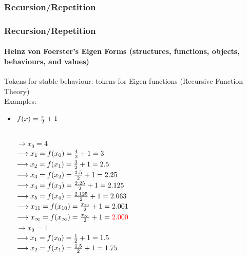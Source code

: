 \documentclass[
	11pt,
	aspectratio=169,
]{beamer}
\begin{document}
            \subsubsection{Recursion/Repetition}
                \begin{frame}
                    \frametitle{Recursion/Repetition}
                    \framesubtitle{Heinz von Foerster's Eigen Forms (structures, functions, objects, behaviours, and values)}
                    Tokens for stable behaviour: tokens for Eigen functions (Recursive Function Theory)\\
                    Examples:
                    \begin{itemize}
                        \item<1-> $f(x)= {{x}\over{2}} +1$\\
                            \fontsize{8}{9.2}\selectfont
                            \begin{columns}
                                    $\longrightarrow x_0=4$\\
                                    $\longrightarrow x_1=f(x_0) = {{4}\over{2}} + 1 = 3$ \\
                                    $\longrightarrow x_2=f(x_1) = {{3}\over{2}} + 1 = 2.5$ \\
                                    $\longrightarrow x_3=f(x_2) = {{2.5}\over{2}} + 1 = 2.25$\\
                                    $\longrightarrow x_4=f(x_3) = {{2.25}\over{2}} + 1 = 2.125$\\
                                    $\longrightarrow x_5=f(x_4) = {{2.125}\over{2}} + 1 = 2.063$\\
                                    $\longrightarrow x_{11}=f(x_{10}) = {{x_{10}}\over{2}} + 1 = 2.001$\\
                                    $\longrightarrow x_\infty=f(x_\infty) = {{x_\infty}\over{2}} + 1 = \textcolor{red}{2.000}$\\
                                    $\longrightarrow x_0=1$\\
                                    $\longrightarrow x_1=f(x_0) = {{1}\over{2}} + 1 = 1.5$ \\
                                    $\longrightarrow x_2=f(x_1) = {{1.5}\over{2}} + 1 = 1.75$ \\

\end{columns}
\end{itemize}
\end{frame}
\end{document}
